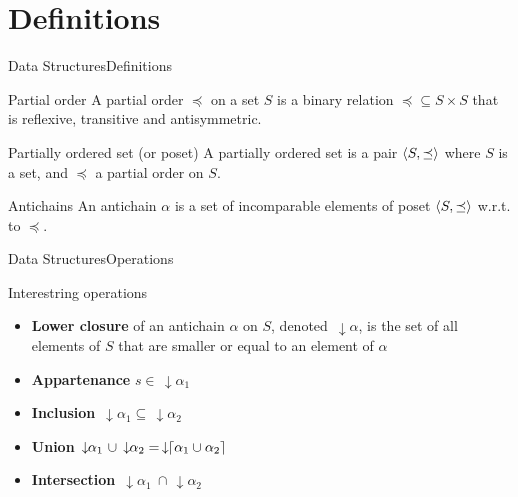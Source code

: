\documentclass[11pt]{beamer}
\DeclarePairedDelimiter{\ceil}{\lceil}{\rceil}
\DeclarePairedDelimiter{\tuple}{\langle}{\rangle}
\newcommand{\darrow}{\, \downarrow \!\!}
\begin{document}
\section{Definitions}

\begin{frame}{Data Structures}{Definitions}
    \begin{block}{Partial order}
        A partial order $\preceq$ on a set $S$ is a binary relation
        $\preceq \subseteq S \times S$
        that is reflexive, transitive and antisymmetric.
    \end{block}
    \begin{block}{Partially ordered set (or poset)}
    A partially ordered set is a pair $\tuple{S, \preceq}$
    where $S$ is a set, and $\preceq$ a partial order on $S$.
    \end{block}
    \begin{block}{Antichains}
    An antichain $\alpha$ is a set of incomparable
    elements of poset $\tuple{S, \preceq}$ w.r.t. to $\preceq$.
    \end{block}

\end{frame}

\begin{frame}{Data Structures}{Operations}
    \begin{block}{Interestring operations}
    \begin{itemize}
        \item \textbf{Lower closure} of an antichain $\alpha$
        on $S$, denoted $\darrow{\alpha}$,
        is the set of all elements of $S$ that are smaller or equal
        to an element of $\alpha$
        \item \textbf{Appartenance} $s \in \darrow \alpha_1$
        \item \textbf{Inclusion} $\darrow \alpha_1 \subseteq \darrow \alpha_2$
        \item \textbf{Union} $ \darrow \alpha_1 \ \cup \darrow \alpha_2 =
        \darrow \ceil{\alpha_1 \cup \alpha_2}$
        \item \textbf{Intersection} $\darrow \alpha_1 \ \cap \darrow \alpha_2$
    \end{itemize}
    \end{block}

\end{frame}
\end{document}
